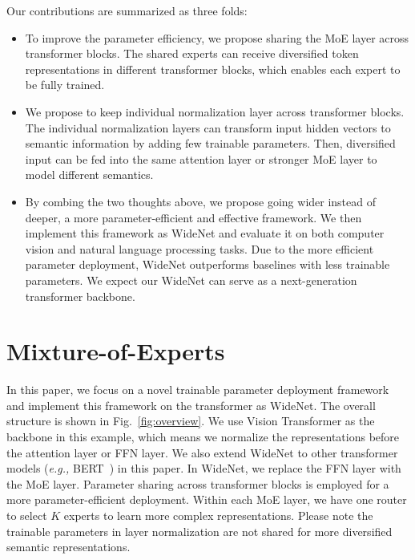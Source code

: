 \documentclass[letterpaper]{article} \usepackage{aaai22}  \usepackage{times}  \usepackage{helvet}  \usepackage{courier}  \usepackage[hyphens]{url}  \usepackage{graphicx} \urlstyle{rm} \def\UrlFont{\rm}  \usepackage{natbib}  \usepackage{caption} \DeclareCaptionStyle{ruled}{labelfont=normalfont,labelsep=colon,strut=off} \frenchspacing  \setlength{\pdfpagewidth}{8.5in}  \setlength{\pdfpageheight}{11in}  \usepackage{algorithm}
\newcommand{\eg}{\emph{e.g.,}\xspace}
\begin{document}
Our contributions are summarized as three folds:

\begin{itemize}

\item To improve the parameter efficiency, we propose sharing the MoE layer across transformer blocks. The shared experts can receive diversified token representations in different transformer blocks, which enables each expert to be fully trained.




\item We propose to keep individual normalization layer across transformer blocks. The individual normalization layers can transform input hidden vectors to semantic information by adding few trainable parameters. Then, diversified input can be fed into the same attention layer or stronger MoE layer to model different semantics.  




\item By combing the two thoughts above, we propose going wider instead of deeper, a more parameter-efficient and effective framework. We then implement this framework as WideNet and evaluate it on both computer vision and natural language processing tasks. Due to the more efficient parameter deployment, WideNet outperforms baselines with less trainable parameters. We expect our WideNet can serve as a next-generation transformer backbone.





\end{itemize}




\section{Mixture-of-Experts}
\label{sec:moe}





In this paper, we focus on a novel trainable parameter deployment framework and implement this framework on the transformer as WideNet. The overall structure is shown in Fig.~\ref{fig:overview}. We use Vision Transformer as the backbone in this example, which means we normalize the representations before the attention layer or FFN layer. We also extend WideNet to other transformer models (\eg BERT~\cite{devlin-etal-2019-bert}) in this paper. In WideNet, we replace the FFN layer with the MoE layer. Parameter sharing across transformer blocks is employed for a more parameter-efficient deployment. Within each MoE layer, we have one router to select $K$ experts to learn more complex representations. Please note the trainable parameters in layer normalization are not shared for more diversified semantic representations.
\end{document}

